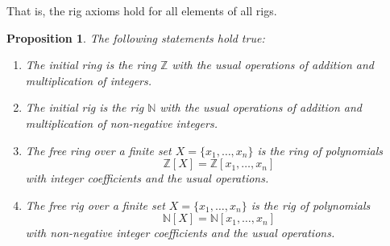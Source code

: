 \documentclass{msthesis}
\newtheorem{prop}[theorem]{Proposition}
\theoremstyle{definition}
\newcommand{\ints}{\mathbb{Z}}
\newcommand{\nat}{\mathbb{N}}
\begin{document}
That is, the rig axioms hold for all elements of all rigs.

\begin{prop}\label{prop:freering_is_zx}
The following statements hold true:
\begin{enumerate}[nosep] 
\item 
The initial ring is the ring $\ints$ with the usual operations 
of addition and multiplication of integers.
\item 
The initial rig is the rig $\nat$ with the usual operations 
of addition and multiplication of non-negative integers.
\item \label{prop:poly-ring}
The free ring over a finite set $X = \{x_1,\dots,x_n\}$ is the 
 ring of polynomials \[\ints[X] = \ints[x_1,\dots,x_n]\] with integer coefficients and the usual operations.
\item 
The free rig over a finite set $X = \{x_1,\dots,x_n\}$ is the 
 rig of polynomials \[\nat[X] = \nat[x_1,\dots,x_n]\] with non-negative integer coefficients and the usual operations.
\end{enumerate}
\end{prop}
\end{document}
